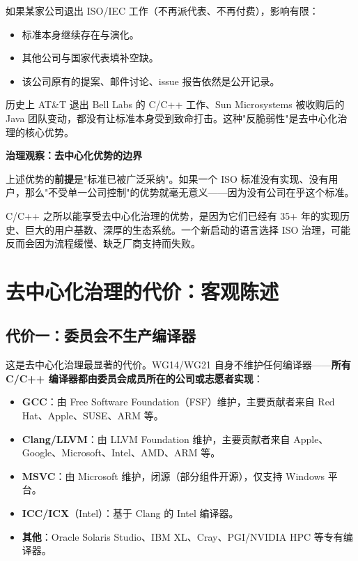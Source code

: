 \documentclass[12pt,a4paper,fontset=fandol]{ctexbook}
\begin{document}
如果某家公司退出 ISO/IEC 工作（不再派代表、不再付费），影响有限：

\begin{itemize}
  \item 标准本身继续存在与演化。
  \item 其他公司与国家代表填补空缺。
  \item 该公司原有的提案、邮件讨论、issue 报告依然是公开记录。
\end{itemize}

历史上 AT\&T 退出 Bell Labs 的 C/C++ 工作、Sun Microsystems 被收购后的 Java 团队变动，都没有让标准本身受到致命打击。这种"反脆弱性"是去中心化治理的核心优势。

\begin{govbox}
\textbf{治理观察：去中心化优势的边界}

上述优势的\textbf{前提}是"标准已被广泛采纳"。如果一个 ISO 标准没有实现、没有用户，那么"不受单一公司控制"的优势就毫无意义——因为没有公司在乎这个标准。

C/C++ 之所以能享受去中心化治理的优势，是因为它们已经有 35+ 年的实现历史、巨大的用户基数、深厚的生态系统。一个新启动的语言选择 ISO 治理，可能反而会因为流程缓慢、缺乏厂商支持而失败。
\end{govbox}

\chapter{去中心化治理的代价：客观陈述}

\section{代价一：委员会不生产编译器}

这是去中心化治理最显著的代价。WG14/WG21 自身不维护任何编译器——\textbf{所有 C/C++ 编译器都由委员会成员所在的公司或志愿者实现}：

\begin{itemize}
  \item \textbf{GCC}：由 Free Software Foundation（FSF）维护，主要贡献者来自 Red Hat、Apple、SUSE、ARM 等。
  \item \textbf{Clang/LLVM}：由 LLVM Foundation 维护，主要贡献者来自 Apple、Google、Microsoft、Intel、AMD、ARM 等。
  \item \textbf{MSVC}：由 Microsoft 维护，闭源（部分组件开源），仅支持 Windows 平台。
  \item \textbf{ICC/ICX}（Intel）：基于 Clang 的 Intel 编译器。
  \item \textbf{其他}：Oracle Solaris Studio、IBM XL、Cray、PGI/NVIDIA HPC 等专有编译器。
\end{itemize}
\end{document}
